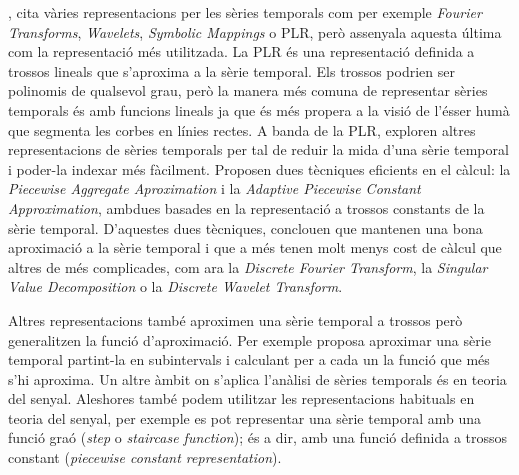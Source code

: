 \textcite{last:keogh}, cita vàries representacions per les sèries
temporals com per exemple \emph{Fourier Transforms}, \emph{Wavelets},
\emph{Symbolic Mappings} o \gls{PLR}, però assenyala aquesta última
com la representació més utilitzada.  La
\gls{PLR} \parencite{keogh97,keogh98} és una representació definida a
trossos lineals que s'aproxima a la sèrie temporal. Els trossos
podrien ser polinomis de qualsevol grau, però la manera més comuna de
representar sèries temporals és amb funcions lineals ja que és més
propera a la visió de l'ésser humà que segmenta les corbes en línies
rectes.  A banda de la \gls{PLR}, \textcite{keogh00,keogh01} exploren
altres representacions de sèries temporals per tal de reduir la mida
d'una sèrie temporal i poder-la indexar més fàcilment. Proposen dues
tècniques eficients en el càlcul: la \emph{Piecewise Aggregate
  Aproximation} i la \emph{Adaptive Piecewise Constant Approximation},
ambdues basades en la representació a trossos constants de la sèrie
temporal.  D'aquestes dues tècniques, \citeauthor{keogh00,keogh01}
conclouen que mantenen una bona aproximació a la sèrie temporal i que
a més tenen molt menys cost de càlcul que altres de més complicades,
com ara la \emph{Discrete Fourier Transform}, la \emph{Singular Value
  Decomposition} o la \emph{Discrete Wavelet Transform}.

Altres representacions també aproximen una sèrie temporal a trossos
però generalitzen la funció d'aproximació. Per exemple
\textcite{last01} proposa aproximar una sèrie temporal partint-la en
subintervals i calculant per a cada un la funció que més s'hi
aproxima.  Un altre àmbit on s'aplica l'anàlisi de sèries temporals és
en teoria del senyal.  Aleshores també podem utilitzar les
representacions habituals en teoria del senyal, per exemple es pot
representar una sèrie temporal amb una funció graó (\emph{step} o
\emph{staircase function}); és a dir, amb una funció definida a
trossos constant (\emph{piecewise constant representation}).






